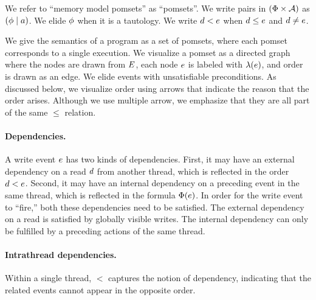 We refer to ``memory model pomsets'' as ``{pomsets}''.
We write pairs in $(\Phi\times\mathcal{A})$ as $(\phi \mid a)$.  We elide
$\phi$ when it is a tautology.
We write $d<e$ when $d\le e$ and $d\neq e$.

We give the semantics of a program as a set of pomsets, where each pomset
corresponds to a single execution.  We visualize a pomset as a directed graph where
the nodes are drawn from $E$, each node $e$ is labeled with
$\lambda(e)$, and order is drawn as an edge.
We elide events with unsatisfiable preconditions.
As discussed below, we visualize order using 
arrows that indicate the reason that the order arises.  Although we use
multiple arrow, we emphasize that they are all part of the same $\le$ relation.

\paragraph{Dependencies.}
A write event $e$ has two kinds of dependencies.  First, it may have an
external dependency on a read $d$ from another thread, which is reflected
in the order $d < e$.  Second, it may have an internal dependency on
a preceding event in the same thread, which is reflected in the formula
$\Phi(e)$.  In order for the write event to ``fire,'' both these
dependencies need to be satisfied.  The external dependency on a read is
satisfied by globally visible writes.  The internal dependency can only be
fulfilled by a preceding actions of the same thread.

\paragraph{Intrathread dependencies.}
Within a single thread, $\lt$ captures the notion of dependency,
indicating that the related events cannot appear in the opposite order.  

